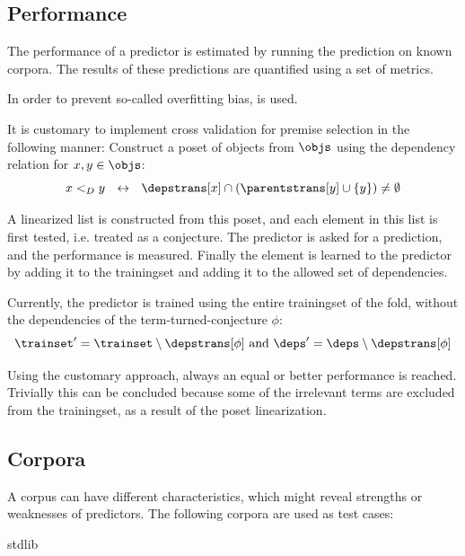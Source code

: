 \subsection{Performance}
The performance of a predictor is estimated by running the prediction on known corpora.
The results of these predictions are quantified using a set of metrics.

In order to prevent so-called overfitting bias, \crossvalidation is used.


It is customary to implement cross validation for premise selection in the following manner:
Construct a poset of objects from $\objs$ using the dependency relation for $x, y \in \objs$:
\[
	x <_D y ~~\leftrightarrow~~ \depstrans[x] \cap (\parentstrans[y] \cup \{y\}) \neq \emptyset
\]

A linearized list is constructed from this poset, and each element in this list is first tested, i.e. treated as a conjecture.
The predictor is asked for a prediction, and the performance is measured.
Finally the element is learned to the predictor by adding it to the trainingset and adding it to the allowed set of dependencies.

Currently, the predictor is trained using the entire trainingset of the fold, without the dependencies of the term-turned-conjecture $\phi$:
\[
	\trainset' = \trainset \setminus \depstrans[\phi] ~\text{and}~ \deps' = \deps \setminus \depstrans[\phi]
\]

Using the customary approach, always an equal or better performance is reached.
Trivially this can be concluded because some of the irrelevant terms are excluded from the trainingset, as a result of the poset linearization.

\subsection{Corpora}
\label{section:corpora}


A corpus can have different characteristics, which might reveal strengths or weaknesses of predictors.
The following corpora are used as test cases:

\begin{description}
	\item[\coq stdlib]
	\item[\compcert]
    \item[\formalin]
    \item[\corn]
    \item[\mathcomp]
\end{description}

